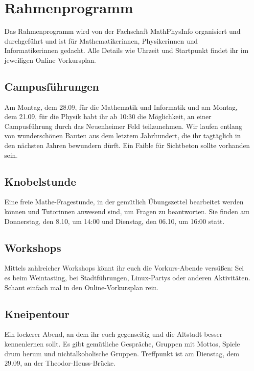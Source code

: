 \newpage
\section{Rahmenprogramm}
\label{vorkurs-rahmenprogramm}

Das Rahmenprogramm wird von der Fachschaft MathPhysInfo organisiert und durchgeführt und ist für Mathematikerinnen, Physikerinnen und Informatikerinnen gedacht. Alle Details wie Uhrzeit und Startpunkt findet ihr im jeweiligen Online-Vorkursplan.

\subsection{Campusführungen}
Am Montag, dem 28.09, für die Mathematik und Informatik und am Montag, dem 21.09, für die Physik habt ihr ab 10:30 die Möglichkeit, an einer Campusführung durch das Neuenheimer Feld teilzunehmen. Wir laufen entlang von wunderschönen Bauten aus dem letztem Jahrhundert, die ihr tagtäglich in den nächsten Jahren bewundern dürft. Ein Faible für Sichtbeton sollte vorhanden sein.

\subsection{Knobelstunde}
Eine freie Mathe-Fragestunde, in der gemütlich Übungszettel bearbeitet werden können und Tutorinnen anwesend sind, um Fragen zu beantworten. Sie finden am Donnerstag, den 8.10, um 14:00 und Dienstag, den 06.10, um 16:00 statt.

\subsection{Workshops}
Mittels zahlreicher Workshops könnt ihr euch die Vorkurs-Abende versüßen: Sei es beim Weintasting, bei Stadtführungen, Linux-Partys oder anderen Aktivitäten. Schaut einfach mal in den Online-Vorkursplan rein.

\subsection{Kneipentour}
Ein lockerer Abend, an dem ihr euch gegenseitig und die Altstadt besser kennenlernen sollt. Es gibt gemütliche Gespräche, Gruppen mit Mottos, Spiele drum herum und nichtalkoholische Gruppen. Treffpunkt ist am Dienstag, dem 29.09, an der Theodor-Heuss-Brücke.

